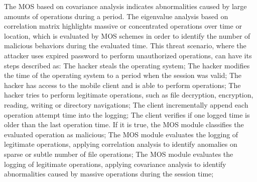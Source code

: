 \documentclass[twocolumn]{svjour3}          %
\begin{document}
The MOS based on covariance analysis indicates abnormalities caused by large amounts of operations during a period. The eigenvalue analysis based on correlation matrix highlights massive or concentrated operations over time or location, which is evaluated by MOS schemes in order to identify the number of malicious behaviors during the evaluated time.
This threat scenario, where the attacker uses expired password to perform unauthorized operations, can have its steps described as:
The hacker steals the operating system;
The hacker modifies the time of the operating system to a period when the session was valid;
The hacker has access to the mobile client and is able to perform operations;
The hacker tries to perform legitimate operations, such as file decryption, encryption, reading, writing or directory navigations;
The client incrementally append each operation attempt time into the logging;
The client verifies if one logged time is older than the last operation time. If it is true, the MOS module classifies the evaluated operation as malicious;
The MOS module evaluates the logging of legitimate operations, applying correlation analysis to identify anomalies on sparse or subtle number of file operations;
The MOS module evaluates the logging of legitimate operations, applying covariance analysis to identify abnormalities caused by massive operations during the session time;
\end{document}
